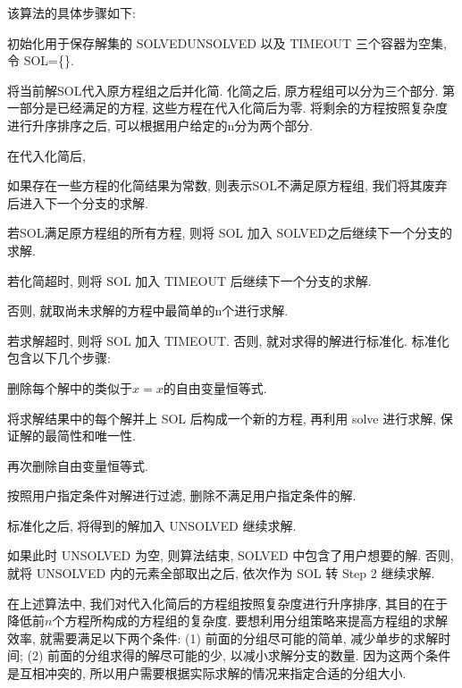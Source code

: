 该算法的具体步骤如下:
\begin{compactenum}[Step 1.]
\item 初始化用于保存解集的 SOLVED\D UNSOLVED 以及 TIMEOUT 三个容器为空集, 令 SOL=\{\}. 
\item 将当前解SOL代入原方程组之后并化简. 化简之后, 原方程组可以分为三个部分. 第一部分是已经满足的方程, 这些方程在代入化简后为零. 将剩余的方程按照复杂度进行升序排序之后, 可以根据用户给定的n分为两个部分. 
\item 在代入化简后, 
    \begin{compactenum}[(a)]
    \item 如果存在一些方程的化简结果为常数, 则表示SOL不满足原方程组, 我们将其废弃后进入下一个分支的求解. 
    \item 若SOL满足原方程组的所有方程, 则将 SOL 加入 SOLVED之后继续下一个分支的求解. 
    \item 若化简超时, 则将 SOL 加入 TIMEOUT 后继续下一个分支的求解. 
    \item 否则, 就取尚未求解的方程中最简单的n个进行求解.
    \end{compactenum}
\item 若求解超时, 则将 SOL 加入 TIMEOUT. 否则, 就对求得的解进行标准化. 标准化包含以下几个步骤:
    \begin{compactenum}[(1)]
    \item 删除每个解中的类似于$x=x$的自由变量恒等式.
    \item 将求解结果中的每个解并上 SOL 后构成一个新的方程, 再利用 solve 进行求解, 保证解的最简性和唯一性. 
    \item 再次删除自由变量恒等式.
    \item 按照用户指定条件对解进行过滤, 删除不满足用户指定条件的解. 
    \end{compactenum}
\item 标准化之后, 将得到的解加入 UNSOLVED 继续求解. 
\item 如果此时 UNSOLVED 为空, 则算法结束, SOLVED 中包含了用户想要的解. 否则, 就将 UNSOLVED 内的元素全部取出之后, 依次作为 SOL 转 Step 2 继续求解. 
\end{compactenum}

在上述算法中, 我们对代入化简后的方程组按照复杂度进行升序排序, 其目的在于降低前$n$个方程所构成的方程组的复杂度.  要想利用分组策略来提高方程组的求解效率, 就需要满足以下两个条件: (1) 前面的分组尽可能的简单, 减少单步的求解时间; (2) 前面的分组求得的解尽可能的少, 以减小求解分支的数量. 因为这两个条件是互相冲突的, 所以用户需要根据实际求解的情况来指定合适的分组大小. 

